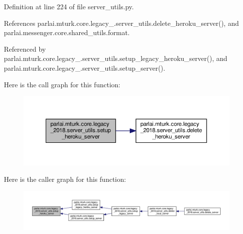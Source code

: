 Definition at line 224 of file server\+\_\+utils.\+py.



References parlai.\+mturk.\+core.\+legacy\+\_.\+server\+\_\+utils.\+delete\+\_\+heroku\+\_\+server(), and parlai.\+messenger.\+core.\+shared\+\_\+utils.\+format.



Referenced by parlai.\+mturk.\+core.\+legacy\+\_.\+server\+\_\+utils.\+setup\+\_\+legacy\+\_\+heroku\+\_\+server(), and parlai.\+mturk.\+core.\+legacy\+\_.\+server\+\_\+utils.\+setup\+\_\+server().

Here is the call graph for this function\+:
\nopagebreak
\begin{figure}[H]
\begin{center}
\leavevmode
\includegraphics[width=350pt]{namespaceparlai_1_1mturk_1_1core_1_1legacy__2018_1_1server__utils_afa5c0e9444c2d4f19817c07a5a193875_cgraph}
\end{center}
\end{figure}
Here is the caller graph for this function\+:
\nopagebreak
\begin{figure}[H]
\begin{center}
\leavevmode
\includegraphics[width=350pt]{namespaceparlai_1_1mturk_1_1core_1_1legacy__2018_1_1server__utils_afa5c0e9444c2d4f19817c07a5a193875_icgraph}
\end{center}
\end{figure}
\mbox{\label{namespaceparlai_1_1mturk_1_1core_1_1legacy__2018_1_1server__utils_afc4023facc69584377d833fe79afe922}} 
